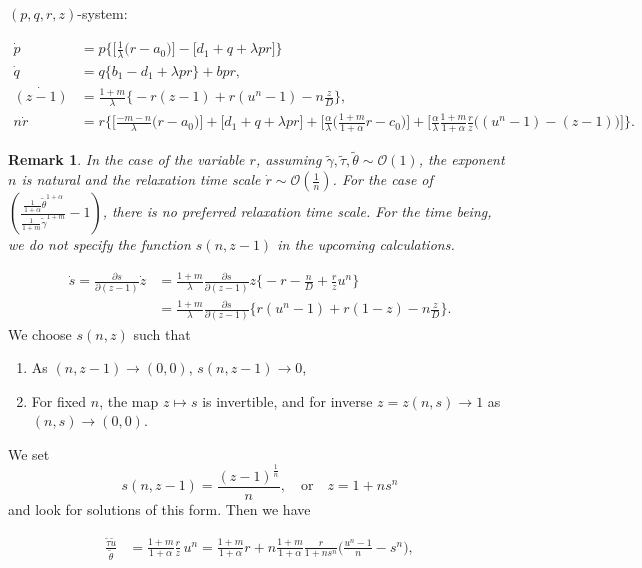 \documentclass[a4paper,11pt]{article}
\def\tg{{\tilde{\gamma}}}
\def\tv{{\tilde{v}}}
\def\tth{{\tilde{\theta}}}
\def\ts{{\tilde{\tau}}}
\def\tu{{\tilde{u}}}
\def\dpp{\dot{p}}
\def\dqq{\dot{q}}
\def\drr{\dot{r}}
\newtheorem{remark}{Remark}[section]
\begin{document}
$(p,q,r,z)$-system:

\begin{equation}
\begin{aligned}
  {\dpp}&=p\bigg\{\Big[\frac{1}{\lambda }\Big(r-a_0\Big)\Big] -\Big[d_1 + q + \lambda p r\Big]\bigg\}\\
  {\dqq}&=q\bigg\{b_1-d_1 + \lambda p r\bigg\} +bpr,\\
  \dot{(z-1)} &=\frac{1+m}{\lambda}\bigg\{-r(z-1) + r(u^n-1) -n\frac{z}{D}\bigg\},\\
 n{\drr}&=r\bigg\{\Big[\frac{-m-n}{\lambda }\Big(r-a_0\Big)\Big]+\Big[d_1 + q + \lambda p r\Big]+\Big[\frac{\alpha}{\lambda }\Big(\frac{1+m}{1+\alpha}r-c_0\Big)\Big] + \Big[\frac{\alpha}{\lambda }\frac{1+m}{1+\alpha} \frac{r}{z}\Big((u^n-1)-(z-1)\Big)\Big]\bigg\}.
\end{aligned}
\end{equation}

\begin{remark}
 In the case of the variable $r$, assuming $\tg, \ts,\tth \sim \mathcal{O}(1)$, the exponent $n$ is natural and the relaxation time scale $\drr \sim \mathcal{O}(\frac{1}{n})$. For the case of $\displaystyle\left(\frac{ \frac{1}{1+\alpha}\tth^{1+\alpha}}{ \frac{1}{1+m}\tg^{1+m} } -1 \right)$, there is no preferred relaxation time scale. For the time being, we do not specify the function $s(n,z-1)$ in the upcoming calculations.
\end{remark}
\begin{align*}
 \dot{s} =\frac{\partial s}{\partial (z-1)} \dot{z}
 &= \frac{1+m}{\lambda}\frac{\partial s}{\partial (z-1)} z\bigg\{-r - \frac{n}{D}+ \frac{r}{z}u^n\bigg\}\\
 &=\frac{1+m}{\lambda}\frac{\partial s}{\partial (z-1)} \bigg\{r(u^n-1) +r(1-z) -n\frac{z}{D}\bigg\}.
\end{align*}
We choose $s(n,z)$ such that
\begin{enumerate}
 \item As $(n,z-1) \rightarrow (0,0)$, $s(n,z-1) \rightarrow 0$, 
 \item For fixed $n$, the map $z \mapsto s$ is invertible, and for inverse $z=z(n,s)\rightarrow 1$ as $(n,s) \rightarrow (0,0)$.
\end{enumerate}
We set 
$$ s(n,z-1) = \frac{(z-1)^{\frac{1}{n}}}{n}, \quad \text{or} \quad z= 1+ns^n$$
and look for solutions of this form. Then we have


\begin{align*}
 \frac{\ts\tu}{\tth} &= \frac{1+m}{1+\alpha} \frac{r}{z}\,u^n = \frac{1+m}{1+\alpha} r + n\frac{1+m}{1+\alpha} \frac{r}{1+ns^n}\Big(\frac{u^n-1}{n}-s^n\Big),%
\end{align*}
\end{document}

